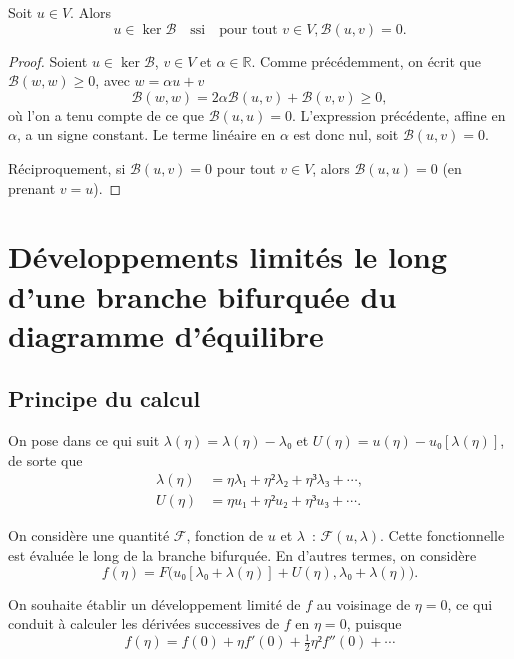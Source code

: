 \documentclass[12pt, final]{amsart}
\begin{document}
Soit \(u∈ V\). Alors
\begin{equation}
  u∈\ker\mathcal B\quad\text{ssi}\quad\text{pour tout }v∈ V, \mathcal B(u, v)=0.
\end{equation}
\begin{proof}
  Soient \(u∈\ker\mathcal B\), \(v∈ V\) et \(\alpha∈ℝ\). Comme
  précédemment, on écrit que \(\mathcal B(w, w)≥0\), avec \(w=\alpha u+v\)
  \begin{equation}
    \mathcal B(w, w)=2\alpha\mathcal B(u, v)+\mathcal B(v, v)≥0,
  \end{equation}
  où l'on a tenu compte de ce que \(\mathcal B(u, u)=0\). L'expression
  précédente, affine en \(\alpha\), a un signe constant. Le terme linéaire en
  \(\alpha\) est donc nul, soit \(\mathcal B(u, v)=0\).

  Réciproquement, si \(\mathcal B(u, v)=0\) pour tout \(v∈ V\), alors
  \(\mathcal B(u, u)=0\) (en prenant \(v=u\)).
\end{proof}

\section{Développements limités le long d'une branche bifurquée du diagramme
  d'équilibre}

\subsection{Principe du calcul}

On pose dans ce qui suit \(λ(η)=λ(η)-λ₀\) et
\(U(η)=u(η)-u₀[λ(η)]\), de sorte que
\begin{align}
  \label{eq:20211112155446}
  λ(η)&=ηλ₁+η²λ₂+η³λ₃+\cdots,\\
  \label{eq:20211112113028}
  U(η)&=η u₁+η² u₂+η³u₃+\cdots.
\end{align}

On considère une quantité \(\mathcal F\), fonction de \(u\) et \(λ\)~:
\(\mathcal F(u, λ)\). Cette fonctionnelle est évaluée le long de la
branche bifurquée. En d'autres termes, on considère
\begin{equation}
  f(η)=F\bigl(u₀[λ₀+λ(η)]+U(η),
  λ₀+λ(η)\bigr).
\end{equation}

On souhaite établir un développement limité de \(f\) au voisinage de
\(η=0\), ce qui conduit à calculer les dérivées successives de \(f\) en
\(η=0\), puisque
\begin{equation}
  f(η)=f(0)+η f'(0)+\tfrac12η²f''(0)+\cdots
\end{equation}
\end{document}
